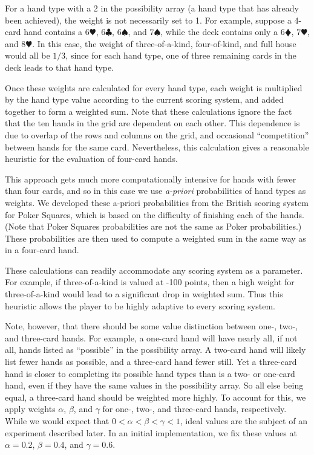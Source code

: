 \documentclass[letterpaper]{article}
\begin{document}
For a hand type with a 2 in the possibility array (a hand type that has already been achieved), the weight is not necessarily set to 1. For example, suppose a 4-card hand contains a $6\varheartsuit$, $6\clubsuit$, $6\spadesuit$, and $7\spadesuit$, while the deck contains only a $6\vardiamondsuit$, $7\varheartsuit$, and $8\varheartsuit$. In this case, the weight of three-of-a-kind, four-of-kind, and full house would all be $1/3$, since for each hand type, one of three remaining cards in the deck leads to that hand type.

Once these weights are calculated for every hand type, each weight is multiplied by the hand type value according to the current scoring system, and added together to form a weighted sum. Note that these calculations ignore the fact that the ten hands in the grid are dependent on each other. This dependence is due to overlap of the rows and columns on the grid, and occasional ``competition'' between hands for the same card. Nevertheless, this calculation gives a reasonable heuristic for the evaluation of four-card hands.

This approach gets much more computationally intensive for hands with fewer than four cards, and so in this case we use {\it a-priori} probabilities of hand types as weights. We developed these a-priori probabilities from the British scoring system for Poker Squares, which is based on the difficulty of finishing each of the hands. (Note that Poker Squares probabilities are not the same as Poker probabilities.) These probabilities are then used to compute a weighted sum in the same way as in a four-card hand.

These calculations can readily accommodate any scoring system as a parameter. For example, if three-of-a-kind is valued at -100 points, then a high weight for three-of-a-kind would lead to a significant drop in weighted sum. Thus this heuristic allows the player to be highly adaptive to every scoring system.

Note, however, that there should be some value distinction between one-, two-, and three-card hands. For example, a one-card hand will have nearly all, if not all, hands listed as ``possible'' in the possibility array. A two-card hand will likely list fewer hands as possible, and a three-card hand fewer still. Yet a three-card hand is closer to completing its possible hand types than is a two- or one-card hand, even if they have the same values in the possibility array. So all else being equal, a three-card hand should be weighted more highly. To account for this, we apply weights $\alpha$, $\beta$, and $\gamma$ for one-, two-, and three-card hands, respectively. While we would expect that $0 < \alpha < \beta < \gamma < 1$, ideal values are the subject of an experiment described later. In an initial implementation, we fix these values at $\alpha = 0.2$, $\beta = 0.4$, and $\gamma = 0.6$.
\end{document}

